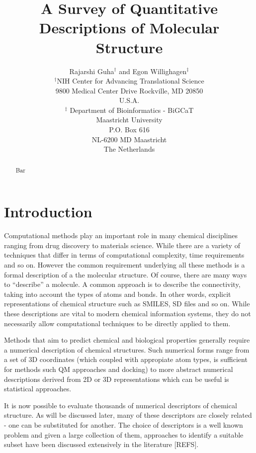 \documentclass[letterpaper, 12pt]{article}
\begin{document}
\title{A Survey of Quantitative Descriptions of Molecular Structure}
\author{Rajarshi Guha${}^{\dagger}$ and Egon Willighagen${}^{\ddagger}$\\
${}^{\dagger}$NIH Center for Advancing Translational Science\\9800 Medical
Center Drive  Rockville, MD 20850 \\U.S.A.\\
${}^{\ddagger}$ Department of Bioinformatics - BiGCaT\\Maastricht University\\P.O. Box 616\\NL-6200 MD Maastricht\\The Netherlands
}
\date{}

\maketitle
\begin{abstract}
Bar
\end{abstract}

\section{Introduction}

Computational methods play an important role in many chemical
disciplines ranging from drug discovery to materials science. While
there are a variety of techniques that differ in terms of
computational complexity, time requirements and so on. However the
common requirement underlying all these methods is a formal
description of a the molecular structure. Of course, there are many
ways to ``describe'' a molecule. A common approach is to describe the
connectivity, taking into account the types of atoms and bonds. In
other words, explicit representations of chemical structure such as
SMILES, SD files and so on. While these descriptions are vital to
modern chemical information systems, they do not necessarily allow
computational techniques to be directly applied to them.

Methods that aim to predict chemical and biological properties
generally require a numerical description of chemical structures. Such
numerical forms range from a set of 3D coordinates (which coupled with
appropiate atom types, is sufficient for methods such QM approaches
and docking) to more abstract numerical descriptions derived from 2D
or 3D representations which can be useful is statistical approaches.

It is now possible to evaluate thousands of numerical descriptors of
chemical structure. As will be discussed later, many of these
descriptors are closely related - one can be substituted for
another. The choice of descriptors is a well known problem and given a
large collection of them, approaches to identify a suitable subset
have been discussed extensively in the literature [REFS]. 
\end{document}
